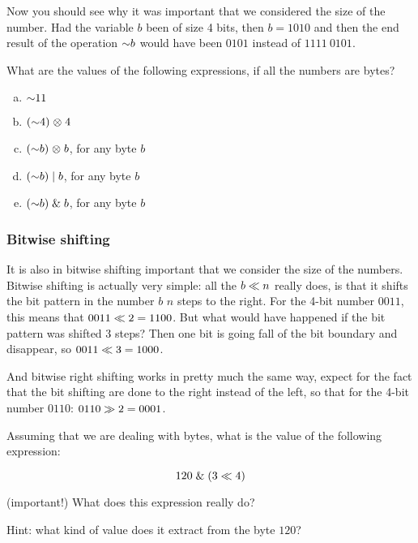 Now you should see why it was important that we considered the size of
the number. Had the variable $b$ been of size 4 bits, then $b = 1010$
and then the end result of the operation $\mathord{\sim} b$ would have been
$0101$ instead of $1111\ 0101$.

\begin{Exercise}[label={bitnot}]
  What are the values of the following expressions, if all the numbers
  are bytes?

  \begin{enumerate}[(a)]
  \item $\mathord{\sim} 11$
  \item $(\mathord{\sim} 4) \mathrel{\otimes} 4$
  \item $(\mathord{\sim} b) \mathrel{\otimes} b$, for any byte $b$
  \item $(\mathord{\sim} b) \mathrel{|} b$, for any byte $b$
  \item $(\mathord{\sim} b) \mathrel{\&} b$, for any byte $b$
  \end{enumerate}

\end{Exercise}

\subsubsection{Bitwise shifting}

It is also in bitwise shifting important that we consider the size of
the numbers. Bitwise shifting is actually very simple: all the $b
\ll n$ really does, is that it shifts the bit pattern in the
number $b$ $n$ steps to the right. For the 4-bit number $0011$, this
means that $0011 \ll 2 = 1100$. But what would have happened if
the bit pattern was shifted 3 steps? Then one bit is going fall of the
bit boundary and disappear, so $0011 \ll 3 = 1000$.

And bitwise right shifting works in pretty much the same way, expect
for the fact that the bit shifting are done to the right instead of
the left, so that for the 4-bit number $0110$: $0110 \gg 2 =
0001$.

\begin{Exercise}[label={bit-shiting}]
  Assuming that we are dealing with bytes, what is the value of the
  following expression:

  \begin{equation*}
    120 \mathrel{\&} (3 \ll 4)
  \end{equation*}

  (important!) What does this expression really do?

  Hint: what kind of value does it extract from the byte $120$?

\end{Exercise}

